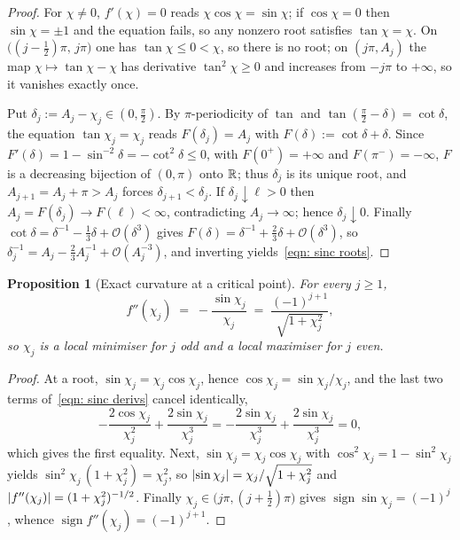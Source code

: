 \documentclass[11pt]{article}
\theoremstyle{plain}
\newtheorem{proposition}[theorem]{Proposition}
\theoremstyle{definition}
\theoremstyle{remark}
\numberwithin{equation}{section}
\providecommand{\defeq}{\mathrel{:=}}
\providecommand{\calO}{\mathcal{O}}
\begin{document}
\begin{proof}
    For $\chi \neq 0$, $f'(\chi) = 0$ reads $\chi\cos \chi = \sin \chi$; if $\cos \chi = 0$ then
    $\sin \chi = \pm1$ and the equation fails, so any nonzero root satisfies $\tan \chi = \chi$.
    On $\bigl((j-\tfrac12)\pi,\, j\pi\bigr)$ one has $\tan \chi \leq 0 < \chi$, so there is no
    root; on $(j\pi, A_j)$ the map $\chi \mapsto \tan \chi - \chi$ has derivative
    $\tan^2\chi \geq 0$ and increases from $-j\pi$ to $+\infty$, so it vanishes exactly once.

    Put $\delta_j \defeq A_j - \chi_j \in (0,\tfrac{\pi}{2})$. By $\pi$-periodicity of $\tan$ and
    $\tan(\tfrac{\pi}{2}-\delta) = \cot\delta$, the equation $\tan\chi_j = \chi_j$ reads
    $F(\delta_j) = A_j$ with $F(\delta) \defeq \cot\delta + \delta$. Since
    $F'(\delta) = 1 - \sin^{-2}\delta = -\cot^2\delta \leq 0$, with $F(0^+) = +\infty$ and
    $F(\pi^-) = -\infty$, $F$ is a decreasing bijection of $(0,\pi)$ onto ${\mathbb{R}}$; thus $\delta_j$ is
    its unique root, and $A_{j+1} = A_j + \pi > A_j$ forces $\delta_{j+1} < \delta_j$. If
    $\delta_j \downarrow \ell > 0$ then $A_j = F(\delta_j) \to F(\ell) < \infty$, contradicting
    $A_j \to \infty$; hence $\delta_j \downarrow 0$. Finally
    $\cot\delta = \delta^{-1} - \tfrac13\delta + \calO(\delta^3)$ gives
    $F(\delta) = \delta^{-1} + \tfrac23\delta + \calO(\delta^3)$, so
    $\delta_j^{-1} = A_j - \tfrac23 A_j^{-1} + \calO(A_j^{-3})$, and
    inverting yields~\eqref{eqn: sinc roots}.
\end{proof}

\begin{proposition}[Exact curvature at a critical point]
\label{prop: sinc exact}
    For every $j \geq 1$,
    \begin{equation}
        f''(\chi_j) \;=\; -\frac{\sin \chi_j}{\chi_j}
                    \;=\; \frac{(-1)^{j+1}}{\sqrt{1 + \chi_j^2}} ,
        \label{eqn: sinc magnitude}
    \end{equation}
    so $\chi_j$ is a local minimiser for $j$ odd and a local maximiser for $j$ even.
\end{proposition}

\begin{proof}
    At a root, $\sin\chi_j = \chi_j\cos\chi_j$, hence $\cos\chi_j = \sin\chi_j/\chi_j$, and the
    last two terms of~\eqref{eqn: sinc derivs} cancel identically,
    \begin{equation*}
        -\frac{2\cos\chi_j}{\chi_j^2} + \frac{2\sin\chi_j}{\chi_j^3}
        = -\frac{2\sin\chi_j}{\chi_j^3} + \frac{2\sin\chi_j}{\chi_j^3} = 0 ,
    \end{equation*}
    which gives the first equality. Next, $\sin\chi_j = \chi_j\cos\chi_j$ with
    $\cos^2\chi_j = 1 - \sin^2\chi_j$ yields $\sin^2\chi_j\,(1+\chi_j^2) = \chi_j^2$, so
    $\left \vert \sin\chi_j \right \vert = \chi_j/\sqrt{1+\chi_j^2}$ and
    $\left \vert f''(\chi_j) \right \vert = (1+\chi_j^2)^{-1/2}$. Finally
    $\chi_j \in \bigl(j\pi, (j+\tfrac12)\pi\bigr)$ gives
    $\operatorname{sign}\sin\chi_j = (-1)^j$, whence
    $\operatorname{sign}f''(\chi_j) = (-1)^{j+1}$.
\end{proof}
\end{document}
